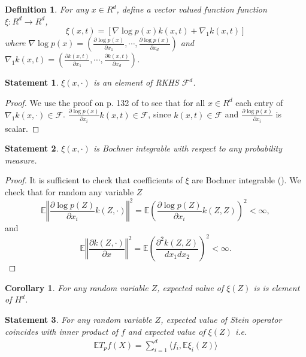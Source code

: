 \documentclass{article}
\newtheorem{definition}{Definition}
\newtheorem{statement}{Statement}
\newtheorem{corollary}{Corollary}
\newcommand{\ev}{\mathbb{E}}
\begin{document}
\begin{definition}
For any $x \in R^d$, define a vector valued function function  $\xi: R^d \to R^d$,
\[
 \xi(x,t) =\left[ \nabla \log p(x) k(x,t)+\nabla_1 k(x,t)\right]
\] 
where $\nabla \log p(x) = \left( \frac{\partial \log p(x)}{ \partial x_1}, \cdots , \frac{\partial \log p(x)}{ \partial x_d} \right)$ and 
$  \nabla_1 k(x,t) = \left( \frac{\partial k(x,t)}{ \partial x_1}, \cdots , \frac{\partial  k(x,t)}{ \partial x_d} \right)$. 
\end{definition}

\begin{statement}
\label{lem:WellDefined}
 $\xi(x,\cdot)$ is an element of RKHS $\mathcal{F}^d$.
\end{statement}
\begin{proof}
 We use the proof on p. 132 of \cite[Corollary 4.36]{SteChr08} to see that for all $x \in R^d$ each entry of $\nabla_1 k(x,\cdot)\in\mathcal{F}$. $\frac{\partial \log p(x)}{ \partial x_i} k(x,t) \in\mathcal{F}$, since $k(x,t) \in\mathcal{F}$ and $\frac{\partial \log p(x)}{ \partial x_i}$ is scalar. 
\end{proof}


\begin{statement}
\label{lem:BochnerInt}
$\xi(x,\cdot)$ is Bochner integrable with respect to any probability measure.
\end{statement}

\begin{proof}
It is sufficient to check that coefficients of $\xi$ are Bochner integrable  (\cite[Definition A.5.20]{SteChr08}). We check that for random any variable $Z$
\[
\ev \left\Vert \frac{\partial \log p(Z) }{\partial x_i} k(Z,\cdot)\right\Vert^2 = \ev \left( \frac{\partial \log p(Z) }{\partial x_i} k(Z,Z) \right)^2 <\infty,
\]
and
\[
\ev \left\Vert \frac{\partial k(Z,\cdot)}{\partial x}\right\Vert^2 =\ev \left(\frac{\partial^{2} k(Z,Z) }{dx_1 dx_2}\right)^2<\infty.
\]
\end{proof}

\begin{corollary}
 For any random variable $Z$, expected value of $\xi(Z)$ is is element of $H^d$.
\end{corollary}


\begin{statement}
For any random variable $Z$, expected value of Stein operator coincides with inner product of $f$ and expected value of $\xi(Z)$ i.e. 
\begin{align}
\ev T_{p} f(X) = \sum_{i=1}^d \langle f_i, \ev \xi_i(Z) \rangle
\end{align}
\end{statement}
\end{document}
